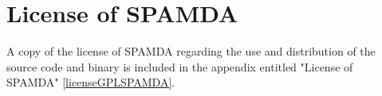 
\chapter{License of SPAMDA}

	\begin{onehalfspace}
	
		A copy of the license of SPAMDA regarding the use and distribution of the source code and binary is included in the appendix entitled "License of SPAMDA" \ref{licenseGPLSPAMDA}.

	\end{onehalfspace}
